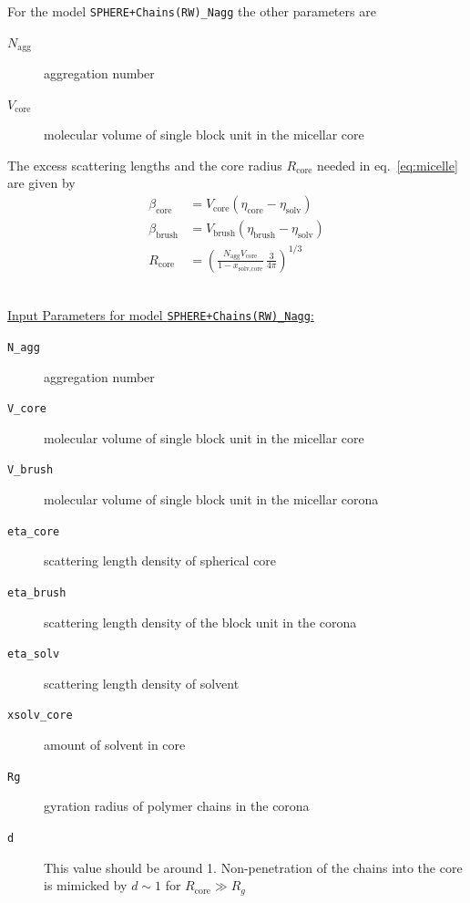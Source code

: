 \noindent
For the model \texttt{SPHERE+Chains(RW)\_Nagg} the other parameters are
\begin{description}
\item[$N_\text{agg}$] aggregation number
\item[$V_\text{core}$] molecular volume of single block unit in the micellar core
\end{description}
The excess scattering lengths and the core radius $R_\text{core}$ needed in eq.\
\ref{eq:micelle} are given by
\begin{align}
\beta_\text{core}  &= V_\text{core}  (\eta_\text{core} -\eta_\text{solv}) \\
\beta_\text{brush} &= V_\text{brush} (\eta_\text{brush}-\eta_\text{solv}) \\
R_\text{core} &= \left( \frac{N_\text{agg} V_\text{core}}{1-x_\text{solv,core}}
                         \, \frac{3}{4\pi}\right)^{1/3}
\end{align}

\hspace{1pt}\\
\uline{Input Parameters for model \texttt{SPHERE+Chains(RW)\_Nagg}:}
\begin{description}
\item[\texttt{N\_agg}] aggregation number
\item[\texttt{V\_core}] molecular volume of single block unit in the micellar core
\item[\texttt{V\_brush}]  molecular volume of single block unit in the micellar corona
\item[\texttt{eta\_core}] scattering length density of spherical core
\item[\texttt{eta\_brush}] scattering length density of the block unit in the corona
\item[\texttt{eta\_solv}] scattering length density of solvent
\item[\texttt{xsolv\_core}] amount of solvent in core
\item[\texttt{Rg}] gyration radius of polymer chains in the corona
\item[\texttt{d}] This value should be around 1. Non-penetration of the chains
into the core is mimicked by $d\sim 1$ for $R_\text{core}\gg R_g$
\end{description}

